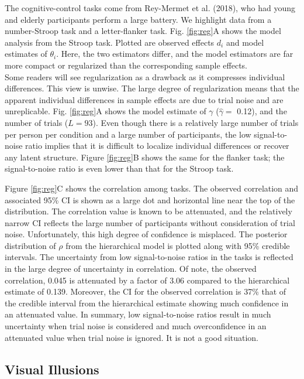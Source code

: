 \documentclass[
  ,man]{apa6}
\begin{document}
The cognitive-control tasks come from Rey-Mermet et al. (2018), who had young and elderly participants perform a large battery. We highlight data from a number-Stroop task and a letter-flanker task. Fig. \ref{fig:reg}A shows the model analysis from the Stroop task. Plotted are observed effects \(d_i\) and model estimates of \(\theta_i\). Here, the two estimators differ, and the model estimators are far more compact or regularized than the corresponding sample effects.\\
Some readers will see regularization as a drawback as it compresses individual differences. This view is unwise. The large degree of regularization means that the apparent individual differences in sample effects are due to trial noise and are unreplicable. Fig. \ref{fig:reg}A shows the model estimate of \(\gamma\) (\(\hat{\gamma}=\)
0.12), and the number of trials (\(L=93\)). Even though there is a relatively large number of trials per person per condition and a large number of participants, the low signal-to-noise ratio implies that it is difficult to localize individual differences or recover any latent structure. Figure \ref{fig:reg}B shows the same for the flanker task; the signal-to-noise ratio is even lower than that for the Stroop task.

Figure \ref{fig:reg}C shows the correlation among tasks. The observed correlation and associated 95\% CI is shown as a large dot and horizontal line near the top of the distribution. The correlation value is known to be attenuated, and the relatively narrow CI reflects the large number of participants without consideration of trial noise. Unfortunately, this high degree of confidence is misplaced. The posterior distribution of \(\rho\) from the hierarchical model is plotted along with 95\% credible intervals. The uncertainty from low signal-to-noise ratios in the tasks is reflected in the large degree of uncertainty in correlation. Of note, the observed correlation, 0.045 is attenuated by a factor of 3.06 compared to the hierarchical estimate of 0.139. Moreover, the CI for the observed correlation is 37\% that of the credible interval from the hierarchical estimate showing much confidence in an attenuated value. In summary, low signal-to-noise ratios result in much uncertainty when trial noise is considered and much overconfidence in an attenuated value when trial noise is ignored. It is not a good situation.

\hypertarget{visual-illusions}{%
\subsection{Visual Illusions}\label{visual-illusions}}
\end{document}
